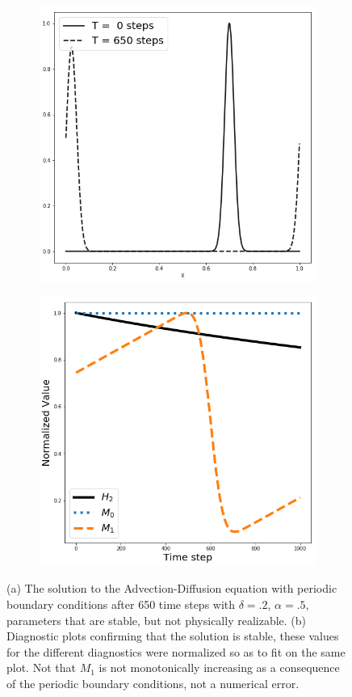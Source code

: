 \documentclass[]{article}
\begin{document}
\begin{figure}
	\begin{subfigure}{.5\textwidth}
		\centering
		\includegraphics[width=.8\linewidth]{figures/stable_not_realizable.png}
		\caption{}
		\label{fig:sfig1}
	\end{subfigure}%
	\begin{subfigure}{.5\textwidth}
		\centering
		\includegraphics[width=.8\linewidth]{figures/stable_not_real_diagnostic.png}
		\caption{}
		\label{fig:sfig2}
	\end{subfigure}
	\caption{(a) The solution to the Advection-Diffusion equation with periodic boundary conditions after 650 time steps with $\delta = .2$, $\alpha = .5$, parameters that are stable, but not physically realizable. (b) Diagnostic plots confirming that the solution is stable, these values for the different diagnostics were normalized so as to fit on the same plot. Not that $M_1$ is not monotonically increasing as a consequence of the periodic boundary conditions, not a numerical error.}
	\label{fig:fig}
\end{figure}
\end{document}
